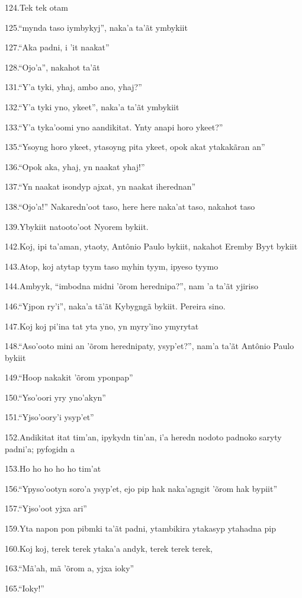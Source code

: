 124.Tek tek otam

125.``mynda taso iymbykyj'', naka'a ta'ãt ymbykiit

127.``Aka padni, i 'it naakat''

128.``Ojo'a'', nakahot ta'ãt

131.``Y'a tyki, yhaj, ambo ano, yhaj?''

132.``Y'a tyki yno, ykeet'', naka'a ta'ãt ymbykiit

133.``Y'a tyka'oomi yno aandikitat. Ynty anapi horo ykeet?''

135.``Ysoyng horo ykeet, ytasoyng pita ykeet, opok akat ytakakãran an''

136.``Opok aka, yhaj, yn naakat yhaj!''

137.``Yn naakat isondyp ajxat, yn naakat iherednan''

138.``Ojo'a!'' Nakaredn'oot taso, here here naka'at taso, nakahot taso

139.Ybykiit natooto'oot Nyorem bykiit.

142.Koj, ipi ta'aman, ytaoty, Antônio Paulo bykiit, nakahot Eremby Byyt
bykiit

143.Atop, koj atytap tyym taso myhin tyym, ipyeso tyymo

144.Ambyyk, ``imbodna midni 'õrom herednipa?'', nam 'a ta'ãt yjiriso

146.``Yjpon ry'i'', naka'a tã'ãt Kybygngã bykiit. Pereira sino.

147.Koj koj pi'ina tat yta yno, yn myry'ino ymyrytat

148.``Aso'ooto mini an 'õrom herednipaty, ysyp'et?'', nam'a ta'ãt
Antônio Paulo bykiit

149.``Hoop nakakit 'õrom yponpap''

150.``Yso'oori yry yno'akyn''

151.``Yjso'oory'i ysyp'et''

152.Andikitat itat tim'an, ipykydn tin'an, i'a heredn nodoto padnoko
saryty padni'a; pyfogidn a

153.Ho ho ho ho ho tim'at

156.``Ypyso'ootyn soro'a ysyp'et, ejo pip hak naka'agngit 'õrom hak
bypiit''

157.``Yjso'oot yjxa ari''

159.Yta napon pon pibmki ta'ãt padni, ytambikira ytakasyp ytahadna pip

160.Koj koj, terek terek ytaka'a andyk, terek terek terek,

163.``Mã'ah, mã 'õrom a, yjxa ioky''

165.``Ioky!''

